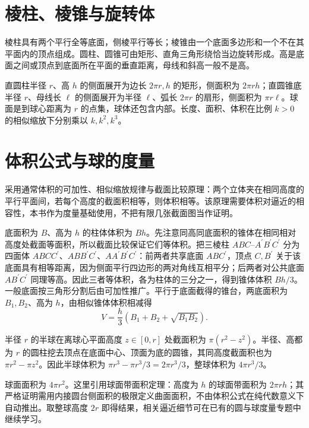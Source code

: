 \section{棱柱、棱锥与旋转体}
棱柱具有两个平行全等底面，侧棱平行等长；棱锥由一个底面多边形和一个不在其平面内的顶点组成。圆柱、圆锥可由矩形、直角三角形绕恰当边旋转形成。高是底面之间或顶点到底面所在平面的垂直距离，母线和斜高一般不是高。

直圆柱半径 $r$、高 $h$ 的侧面展开为边长 $2\pi r,h$ 的矩形，侧面积为 $2\pi rh$；直圆锥底半径 $r$、母线长 $\ell$ 的侧面展开为半径 $\ell$、弧长 $2\pi r$ 的扇形，侧面积为 $\pi r\ell$。球面是到球心距离为 $r$ 的点集，球体还包含内部。长度、面积、体积在比例 $k>0$ 的相似缩放下分别乘以 $k,k^2,k^3$。

\section{体积公式与球的度量}
采用通常体积的可加性、相似缩放规律与截面比较原理：两个立体夹在相同高度的平行平面间，若每个高度的截面积相等，则体积相等。该原理需要体积对逼近的相容性，本书作为度量基础使用，不把有限几张截面图当作证明。

底面积为 $B$、高为 $h$ 的柱体体积为 $Bh$。先注意同高同底面积的锥体在相同相对高度处截面等面积，所以截面比较保证它们等体积。把三棱柱 $ABC$--$A^{\prime}B^{\prime}C^{\prime}$ 分为四面体 $ABCC^{\prime}$、$ABB^{\prime}C^{\prime}$、$AA^{\prime}B^{\prime}C^{\prime}$：前两者共享底面 $ABC^{\prime}$，顶点 $C,B^{\prime}$ 关于该底面具有相等距离，因为侧面平行四边形的两对角线互相平分；后两者对公共底面 $AB^{\prime}C^{\prime}$ 同理等高。因此三者等体积，各为柱体的三分之一，得到锥体体积 $Bh/3$。一般底面按三角形分割后由可加性推广。平行于底面截得的锥台，两底面积为 $B_1,B_2$、高为 $h$，由相似锥体体积相减得
\[
 V=\frac h3(B_1+B_2+\sqrt{B_1B_2}).
\]

半径 $r$ 的半球在离球心平面高度 $z\in[0,r]$ 处截面积为 $\pi(r^2-z^2)$。半径、高都为 $r$ 的圆柱挖去顶点在底面中心、顶面为底的圆锥，其同高度截面积也为 $\pi r^2-\pi z^2$。因此半球体积为 $\pi r^3-\pi r^3/3=2\pi r^3/3$，整球体积为 $4\pi r^3/3$。

球面面积为 $4\pi r^2$。这里引用球面带面积定理：高度为 $h$ 的球面带面积为 $2\pi rh$；其严格证明需用内接圆台侧面积的极限定义曲面面积，不由体积公式在纯代数意义下自动推出。取整球高度 $2r$ 即得结果，相关逼近细节可在已有的圆与球度量专题中继续学习。

